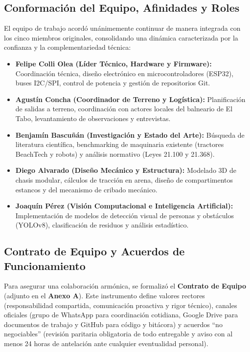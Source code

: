 \documentclass[12pt,letterpaper]{article}
\begin{document}
\subsection{Conformación del Equipo, Afinidades y Roles}
El equipo de trabajo acordó unánimemente continuar de manera integrada con los cinco miembros originales, consolidando una dinámica caracterizada por la confianza y la complementariedad técnica:
\begin{itemize}[leftmargin=*, noitemsep, topsep=0pt]
    \item \textbf{Felipe Colli Olea (Líder Técnico, Hardware y Firmware):} Coordinación técnica, diseño electrónico en microcontroladores (ESP32), buses I2C/SPI, control de potencia y gestión de repositorios Git.
    \item \textbf{Agustín Concha (Coordinador de Terreno y Logística):} Planificación de salidas a terreno, coordinación con actores locales del balneario de El Tabo, levantamiento de observaciones y entrevistas.
    \item \textbf{Benjamín Bascuñán (Investigación y Estado del Arte):} Búsqueda de literatura científica, benchmarking de maquinaria existente (tractores BeachTech y robots) y análisis normativo (Leyes 21.100 y 21.368).
    \item \textbf{Diego Alvarado (Diseño Mecánico y Estructura):} Modelado 3D de chasis modular, cálculos de tracción en arena, diseño de compartimentos estancos y del mecanismo de cribado mecánico.
    \item \textbf{Joaquín Pérez (Visión Computacional e Inteligencia Artificial):} Implementación de modelos de detección visual de personas y obstáculos (YOLOv8), clasificación de residuos y análisis estadístico.
\end{itemize}

\subsection{Contrato de Equipo y Acuerdos de Funcionamiento}
Para asegurar una colaboración armónica, se formalizó el \textbf{Contrato de Equipo} (adjunto en el \textbf{Anexo A}). Este instrumento define valores rectores (responsabilidad compartida, comunicación proactiva y rigor técnico), canales oficiales (grupo de WhatsApp para coordinación cotidiana, Google Drive para documentos de trabajo y GitHub para código y bitácora) y acuerdos ``no negociables'' (revisión paritaria obligatoria de todo entregable y aviso con al menos 24 horas de antelación ante cualquier eventualidad personal).
\end{document}

